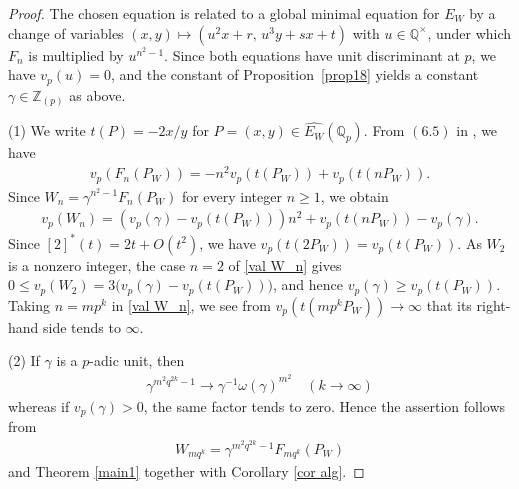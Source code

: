 \documentclass[11pt]{amsart}
\theoremstyle{definition}
\newcommand{\Q}{\mathbb{Q}}
\newcommand{\Z}{\mathbb{Z}}
\begin{document}
\begin{proof}
The chosen equation is related to a global minimal equation for $E_W$ by a
change of variables $(x,y) \mapsto (u^2x+r,\, u^3y+sx+t)$ with
$u \in \Q^{\times}$, under which $F_n$ is multiplied by $u^{n^2-1}$. Since
both equations have unit discriminant at $p$, we have $v_p(u)=0$, and the
constant of Proposition~\ref{prop18} yields a constant
$\gamma \in \Z_{(p)}$ as above.


\noindent\textup{(1)} We write $t(P)=-2x/y$ for $P=(x, y) \in \widehat{E_W}(\Q_p)$. From $(6.5)$ in \cite{St16}, we have
%
\begin{align*}
v_p(F_n(P_W))=-n^2 v_p(t(P_W))+ v_p(t(nP_W)).
\end{align*}
%
Since $W_n=\gamma^{n^2-1}F_n(P_W)$ for every integer $n \geq 1$, we obtain
%
\begin{align}\label{val W_n}
v_p(W_n)=( v_p(\gamma)-v_p(t(P_W))) n^2+v_p(t(nP_W))-v_p(\gamma).
\end{align}
%
Since $[2]^*(t)=2t+O(t^2)$, we have $v_p(t(2P_W))=v_p(t(P_W))$. As $W_2$ is a nonzero integer, the case $n=2$ of \eqref{val W_n} gives $0\leq v_p(W_2)=3\bigl(v_p(\gamma)-v_p(t(P_W))\bigr)$, and hence $v_p(\gamma)\geq v_p(t(P_W))$. Taking $n=mp^k$ in \eqref{val W_n}, we see from $v_p(t(mp^kP_W)) \to \infty$ that its right-hand side tends to $\infty$.

\medskip
\noindent\textup{(2)} If $\gamma$ is a $p$-adic unit, then
%
\begin{align*}
\gamma^{m^2q^{2k}-1} \to \gamma^{-1}\omega(\gamma)^{m^2} \quad (k \to \infty)
\end{align*}
%
whereas if $v_p(\gamma)>0$, the same factor tends to zero. Hence the assertion follows from
%
\begin{align*}
W_{mq^{k}}=\gamma^{m^2q^{2k}-1}F_{mq^k}(P_W)
\end{align*}
%
and Theorem \ref{main1} together with Corollary \ref{cor alg}.
\end{proof}
\end{document}
